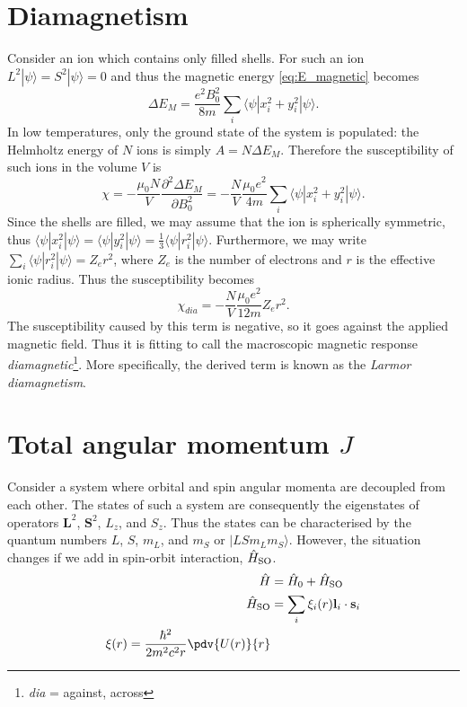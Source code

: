 \section{Diamagnetism}
Consider an ion which contains only filled shells. For such an ion $L^2|\psi\rangle = S^2|\psi\rangle = 0$ and thus the magnetic energy \eqref{eq:E_magnetic} becomes
\begin{equation}
\Delta E_M = \frac{e^2 B_0^2}{8 m}\sum_i \langle \psi | x_i^2 + y_i^2 | \psi \rangle.
\end{equation}
In low temperatures, only the ground state of the system is populated: the Helmholtz energy of $N$ ions is simply $A = N\Delta E_M$. Therefore the susceptibility of such ions in the volume $V$ is
\begin{equation}
\chi = -\frac{\mu_0 N}{V} \frac{\partial^2 \Delta E_M}{\partial B_0^2}
= -\frac{N}{V} \frac{\mu_0 e^2}{4 m}\sum_i \langle \psi | x_i^2 + y_i^2 | \psi \rangle.
\end{equation}
Since the shells are filled, we may assume that the ion is spherically symmetric, thus $\langle \psi | x_i^2| \psi \rangle = \langle \psi | y_i^2 | \psi \rangle = \frac{1}{3} \langle \psi | r_i^2| \psi \rangle $. Furthermore, we may write $\sum_i \langle \psi | r_i^2| \psi \rangle = Z_{e} r^2$, where $Z_{e}$ is the number of electrons and $r$ is the effective ionic radius. Thus the susceptibility becomes
\begin{equation}
\chi_{dia} =  -\frac{N}{V} \frac{\mu_0  e^2}{12 m} Z_{e} r^2.
\end{equation}
The susceptibility caused by this term is negative, so it goes against the applied magnetic field. Thus it is fitting to call the macroscopic magnetic response \emph{diamagnetic}\footnote{\emph{dia} = against, across}. More specifically, the derived term is known as the \emph{Larmor diamagnetism}.


\section{Total angular momentum $J$}

Consider a system where orbital and spin angular momenta are decoupled from each other. The states of such a system are consequently the eigenstates of operators $\mathbf{L}^2$, $\mathbf{S}^2$, $L_z$, and  $S_z$. Thus the states can be characterised by the quantum numbers $L$, $S$, $m_L$, and $m_S$  or $|LSm_Lm_S\rangle$. However, the situation changes if we add in spin-orbit interaction, $\Hat{H}_{\rm SO}$. 
\begin{align}
\hat{H} &= \hat{H}_0 + \Hat{H}_{\rm SO}\\
\Hat{H}_{\rm SO} &= \sum_i\xi_i(r) \mathbf{l}_i \cdot \mathbf{s}_i\\
\xi(r) = \frac{\hbar^2}{2m^2c^2r}\pdv{U(r)}{r}
\end{align}

